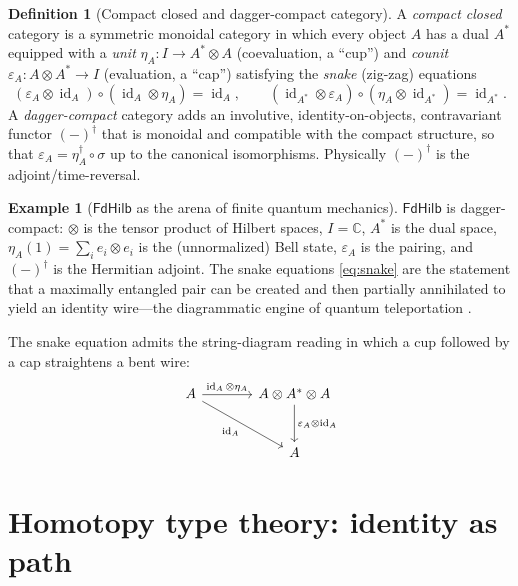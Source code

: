 \documentclass[12pt]{article}
\theoremstyle{definition}
\newtheorem{definition}[theorem]{Definition}
\newtheorem{example}[theorem]{Example}
\theoremstyle{remark}
\newcommand{\FdHilb}{\mathsf{FdHilb}}
\newcommand{\id}{\operatorname{id}}
\begin{document}
\begin{definition}[Compact closed and dagger-compact category]
\label{def:dagger}
A \emph{compact closed} category is a symmetric monoidal category in which every
object $A$ has a dual $A^{*}$ equipped with a \emph{unit}
$\eta_A:I\to A^{*}\otimes A$ (coevaluation, a ``cup'') and \emph{counit}
$\varepsilon_A:A\otimes A^{*}\to I$ (evaluation, a ``cap'') satisfying the
\emph{snake} (zig-zag) equations
\begin{equation}
\label{eq:snake}
(\varepsilon_A\otimes\id_A)\circ(\id_A\otimes\eta_A)=\id_A,\qquad
(\id_{A^{*}}\otimes\varepsilon_A)\circ(\eta_A\otimes\id_{A^{*}})=\id_{A^{*}}.
\end{equation}
A \emph{dagger-compact} category adds an involutive, identity-on-objects,
contravariant functor $(-)^{\dagger}$ that is monoidal and compatible with the
compact structure, so that $\varepsilon_A=\eta_A^{\dagger}\circ\sigma$ up to the
canonical isomorphisms. Physically $(-)^{\dagger}$ is the adjoint/time-reversal.
\end{definition}

\begin{example}[$\FdHilb$ as the arena of finite quantum mechanics]
\label{ex:fdhilb}
$\FdHilb$ is dagger-compact: $\otimes$ is the tensor product of Hilbert spaces,
$I=\mathbb{C}$, $A^{*}$ is the dual space, $\eta_A(1)=\sum_i e_i\otimes e_i$ is
the (unnormalized) Bell state, $\varepsilon_A$ is the pairing, and
$(-)^{\dagger}$ is the Hermitian adjoint. The snake equations \eqref{eq:snake}
are the statement that a maximally entangled pair can be created and then
partially annihilated to yield an identity wire---the diagrammatic engine of
quantum teleportation \cite{AbramskyCoecke2004,BaezStay2009}.
\end{example}

The snake equation admits the string-diagram reading in which a cup followed by a
cap straightens a bent wire:
\begin{equation}
\label{eq:snake-cd}
\begin{tikzcd}[column sep=large, row sep=large]
A \arrow[r, "\id_A\otimes\eta_A"] \arrow[dr, "\id_A"'] & A\otimes A^{*}\otimes A \arrow[d, "\varepsilon_A\otimes\id_A"] \\
& A
\end{tikzcd}
\end{equation}

\section{Homotopy type theory: identity as path}
\label{sec:hott}
\end{document}
